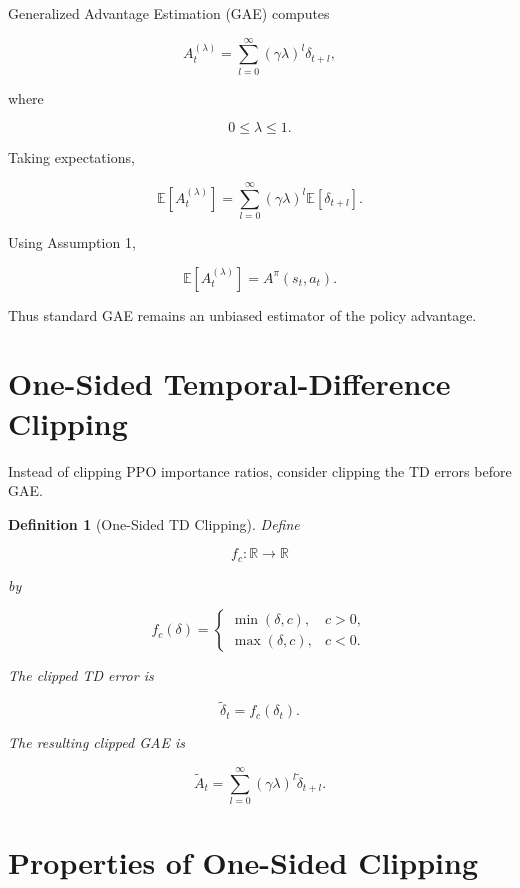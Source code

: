 \documentclass[11pt]{article}
\newtheorem{definition}{Definition}
\begin{document}
Generalized Advantage Estimation (GAE) computes

\[
A_t^{(\lambda)}
=
\sum_{l=0}^{\infty}
(\gamma\lambda)^l
\delta_{t+l},
\]

where

\[
0\le\lambda\le1.
\]

Taking expectations,

\[
\mathbb E
[
A_t^{(\lambda)}
]
=
\sum_{l=0}^{\infty}
(\gamma\lambda)^l
\mathbb E[\delta_{t+l}].
\]

Using Assumption 1,

\[
\boxed{
\mathbb E
[
A_t^{(\lambda)}
]
=
A^\pi(s_t,a_t).
}
\]

Thus standard GAE remains an unbiased estimator of the policy
advantage.


\section{One-Sided Temporal-Difference Clipping}

Instead of clipping PPO importance ratios,
consider clipping the TD errors before GAE.

\begin{definition}[One-Sided TD Clipping]

Define

\[
f_c:\mathbb R\rightarrow\mathbb R
\]

by

\[
f_c(\delta)
=
\begin{cases}
\min(\delta,c),
&
c>0,
\\[2ex]
\max(\delta,c),
&
c<0.
\end{cases}
\]

The clipped TD error is

\[
\widetilde\delta_t
=
f_c(\delta_t).
\]

The resulting clipped GAE is

\[
\widetilde A_t
=
\sum_{l=0}^{\infty}
(\gamma\lambda)^l
\widetilde\delta_{t+l}.
\]

\end{definition}


\section{Properties of One-Sided Clipping}
\end{document}
